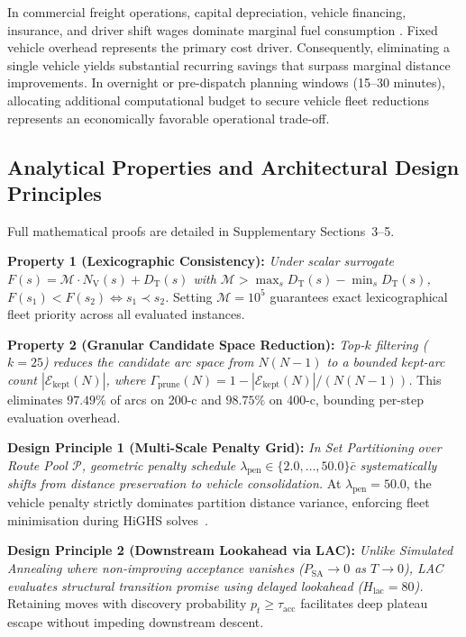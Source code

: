 \documentclass{ieeeaccess}
\newcommand{\NV}{{N_\mathrm{V}}}
\newcommand{\TD}{{D_\mathrm{T}}}
\begin{document}
In commercial freight operations, capital depreciation, vehicle financing, insurance, and driver shift wages dominate marginal fuel consumption \cite{Toth2014, braysy2005vehicle}. Fixed vehicle overhead represents the primary cost driver. Consequently, eliminating a single vehicle yields substantial recurring savings that surpass marginal distance improvements. In overnight or pre-dispatch planning windows (15--30 minutes), allocating additional computational budget to secure vehicle fleet reductions represents an economically favorable operational trade-off.

\subsection{Analytical Properties and Architectural Design Principles}
\label{sec:disc_theory}
Full mathematical proofs are detailed in Supplementary Sections~3--5.

\textbf{Property 1 (Lexicographic Consistency):} \textit{Under scalar surrogate $F(s) = \mathcal{M} \cdot \NV(s) + \TD(s)$ with $\mathcal{M} > \max_{s} \TD(s) - \min_{s} \TD(s)$, $F(s_1) < F(s_2) \iff s_1 \prec s_2$.} Setting $\mathcal{M} = 10^5$ guarantees exact lexicographical fleet priority across all evaluated instances.

\textbf{Property 2 (Granular Candidate Space Reduction):} \textit{Top-$k$ filtering ($k=25$) reduces the candidate arc space from $N(N-1)$ to a bounded kept-arc count $|\mathcal{E}_{\text{kept}}(N)|$, where $\Gamma_{\text{prune}}(N) = 1 - |\mathcal{E}_{\text{kept}}(N)|/(N(N-1))$.} This eliminates $97.49\%$ of arcs on 200-c and $98.75\%$ on 400-c, bounding per-step evaluation overhead.

\textbf{Design Principle 1 (Multi-Scale Penalty Grid):} \textit{In Set Partitioning over Route Pool $\mathcal{P}$, geometric penalty schedule $\lambda_{\text{pen}} \in \{2.0, \dots, 50.0\}\bar{c}$ systematically shifts from distance preservation to vehicle consolidation.} At $\lambda_{\text{pen}}=50.0$, the vehicle penalty strictly dominates partition distance variance, enforcing fleet minimisation during HiGHS solves~\cite{huangfu2018parallelizing}.

\textbf{Design Principle 2 (Downstream Lookahead via LAC):} \textit{Unlike Simulated Annealing where non-improving acceptance vanishes ($P_{\text{SA}} \to 0$ as $T \to 0$), LAC evaluates structural transition promise using delayed lookahead ($H_{\text{lac}} = 80$).} Retaining moves with discovery probability $p_t \ge \tau_{\text{acc}}$ facilitates deep plateau escape without impeding downstream descent.
\end{document}

